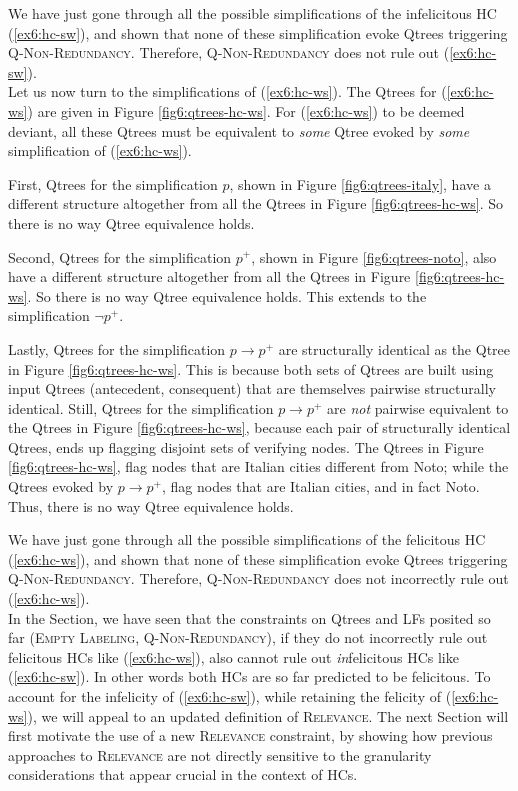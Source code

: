 We have just gone through all the possible simplifications of the infelicitous HC (\ref{ex6:hc-sw}), and shown that none of these simplification evoke Qtrees triggering \textsc{Q-Non-Redundancy}. Therefore, \textsc{Q-Non-Redundancy} does not rule out (\ref{ex6:hc-sw}).\\

Let us now turn to the simplifications of (\ref{ex6:hc-ws}). The Qtrees for (\ref{ex6:hc-ws}) are given in Figure \ref{fig6:qtrees-hc-ws}. For (\ref{ex6:hc-ws}) to be deemed deviant, all these Qtrees must be equivalent to \textit{some} Qtree evoked by \textit{some} simplification of (\ref{ex6:hc-ws}).

First, Qtrees for the simplification $p$, shown in Figure \ref{fig6:qtrees-italy}, have a different structure altogether from all the Qtrees in Figure \ref{fig6:qtrees-hc-ws}. So there is no way Qtree equivalence holds.

Second, Qtrees for the simplification $p^+$, shown in Figure \ref{fig6:qtrees-noto}, also have a different structure altogether from all the Qtrees in Figure \ref{fig6:qtrees-hc-ws}. So there is no way Qtree equivalence holds. This extends to the simplification $\neg p^+$.


Lastly, Qtrees for the simplification $p\rightarrow p^+$ are structurally identical as the Qtree in Figure \ref{fig6:qtrees-hc-ws}. This is because both sets of Qtrees are built using input Qtrees (antecedent, consequent) that are themselves pairwise structurally identical. Still, Qtrees for the simplification $p\rightarrow p^+$ are \textit{not} pairwise equivalent to the Qtrees in Figure \ref{fig6:qtrees-hc-ws}, because each pair of structurally identical Qtrees, ends up flagging disjoint sets of verifying nodes. The Qtrees in Figure \ref{fig6:qtrees-hc-ws}, flag nodes that are Italian cities different from Noto; while the Qtrees evoked by $p\rightarrow p^+$, flag nodes that are Italian cities, and in fact Noto. Thus, there is no way Qtree equivalence holds.

We have just gone through all the possible simplifications of the felicitous HC (\ref{ex6:hc-ws}), and shown that none of these simplification evoke Qtrees triggering \textsc{Q-Non-Redundancy}. Therefore, \textsc{Q-Non-Redundancy} does not incorrectly rule out (\ref{ex6:hc-ws}).\\




In the Section, we have seen that the constraints on Qtrees and LFs posited so far (\textsc{Empty Labeling}, \textsc{Q-Non-Redundancy}), if they do not incorrectly rule out felicitous HCs like (\ref{ex6:hc-ws}), also cannot rule out \textit{in}felicitous HCs like (\ref{ex6:hc-sw}). In other words both HCs are so far predicted to be felicitous. To account for the infelicity of (\ref{ex6:hc-sw}), while retaining the felicity of (\ref{ex6:hc-ws}), we will appeal to an updated definition of \textsc{Relevance}. The next Section will first motivate the use of a new \textsc{Relevance} constraint, by showing how previous approaches to \textsc{Relevance} are not directly sensitive to the granularity considerations that appear crucial in the context of HCs.

